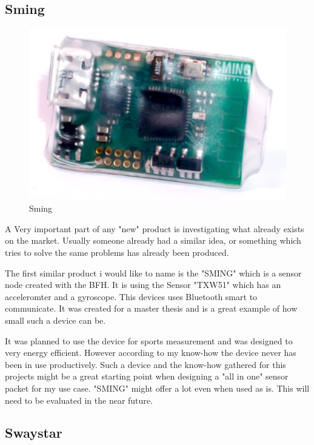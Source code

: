 \subsection{Sming}

\begin{figure}
  \begin{center}
\includegraphics[width=\linewidth]{images/sming_pic2.jpg}
  \end{center}
  \caption{\label{fig:Sming}Sming \cite{sming:book}}
\end{figure}
A Very important part of any "new" product is investigating what already exists on the market.
Usually someone already had a similar idea, or something which tries to solve the same problems has already been produced. 

The first similar product i would like to name is the "SMING" which is a sensor node created with the BFH. 
It is using the Sensor "TXW51" which has an acceleromter and a gyroscope. This devices uses Bluetooth smart to communicate. It was created for a master thesis and is a great example of how small such a device can be. 

It was planned to use the device for sports measurement and was designed to very energy efficient. However according to my know-how the device never has been in use productively. \cite{sming:book}
Such a device and the know-how gathered for this projects might be a great starting point when designing a "all in one" sensor packet for my use case. "SMING" might offer a lot even when used as is. This will need to be evaluated in the near future.
\newpage
\subsection{Swaystar}

